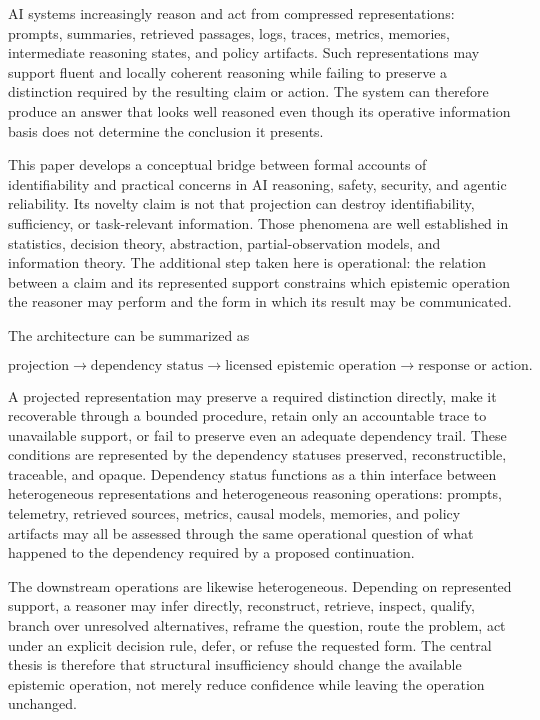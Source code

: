 \documentclass[11pt]{article}
\theoremstyle{definition}
\theoremstyle{remark}
\begin{document}
AI systems increasingly reason and act from compressed representations: prompts, summaries, retrieved passages, logs, traces, metrics, memories, intermediate reasoning states, and policy artifacts. Such representations may support fluent and locally coherent reasoning while failing to preserve a distinction required by the resulting claim or action. The system can therefore produce an answer that looks well reasoned even though its operative information basis does not determine the conclusion it presents.

This paper develops a conceptual bridge between formal accounts of identifiability and practical concerns in AI reasoning, safety, security, and agentic reliability. Its novelty claim is not that projection can destroy identifiability, sufficiency, or task-relevant information. Those phenomena are well established in statistics, decision theory, abstraction, partial-observation models, and information theory. The additional step taken here is operational: the relation between a claim and its represented support constrains which epistemic operation the reasoner may perform and the form in which its result may be communicated.

The architecture can be summarized as

\[
\boxed{
\text{projection}
\rightarrow
\text{dependency status}
\rightarrow
\text{licensed epistemic operation}
\rightarrow
\text{response or action}.
}
\]

A projected representation may preserve a required distinction directly, make it recoverable through a bounded procedure, retain only an accountable trace to unavailable support, or fail to preserve even an adequate dependency trail. These conditions are represented by the dependency statuses preserved, reconstructible, traceable, and opaque. Dependency status functions as a thin interface between heterogeneous representations and heterogeneous reasoning operations: prompts, telemetry, retrieved sources, metrics, causal models, memories, and policy artifacts may all be assessed through the same operational question of what happened to the dependency required by a proposed continuation.

The downstream operations are likewise heterogeneous. Depending on represented support, a reasoner may infer directly, reconstruct, retrieve, inspect, qualify, branch over unresolved alternatives, reframe the question, route the problem, act under an explicit decision rule, defer, or refuse the requested form. The central thesis is therefore that structural insufficiency should change the available epistemic operation, not merely reduce confidence while leaving the operation unchanged.
\end{document}
